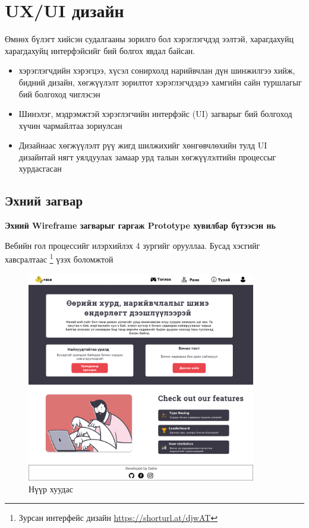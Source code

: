 \pagebreak
\section{UX/UI дизайн}

Өмнөх бүлэгт хийсэн судалгааны зорилго бол хэрэглэгчдэд ээлтэй, харагдахуйц харагдахуйц интерфэйсийг бий болгох явдал байсан.

\begin{itemize}
	\item хэрэглэгчдийн хэрэгцээ, хүсэл сонирхолд нарийвчлан дүн шинжилгээ хийж, бидний дизайн, хөгжүүлэлт зорилтот хэрэглэгчдэдээ хамгийн сайн туршлагыг бий болгоход чиглэсэн
	\item Шинэлэг, мэдрэмжтэй хэрэглэгчийн интерфэйс (UI) загварыг бий болгоход хүчин чармайлтаа зориулсан
	\item Дизайнаас хөгжүүлэлт рүү жигд шилжихийг хөнгөвчлөхийн тулд UI дизайнтай нягт уялдуулах замаар урд талын хөгжүүлэлтийн процессыг хурдасгасан
\end{itemize}

\subsection{Эхний загвар}

\textbf{Эхний Wireframe загварыг гаргаж Prototype хувилбар бүтээсэн нь}

Вебийн гол процессийг илэрхийлэх 4 зургийг орууллаа. Бусад хэсгийг хавсралтаас \footnote{Зурсан интерфейс дизайн \url{https://shorturl.at/djwAT}} үзэх боломжтой

\begin{figure}[h]
	\centering
	\includegraphics[width=10cm]{images/interfaces/ver1/mainpage.png}
	\caption{Нүүр хуудас}
	\label{fig:interface-v1-01}
\end{figure}

